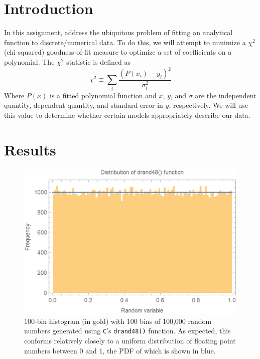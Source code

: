 \documentclass{article}
\author{\hwauthor}
\title{\hwtitle}
\date{\hwdate}
\begin{document}
\maketitle
\thispagestyle{fancy}

\section{Introduction}

In this assignment, address the ubiquitous problem of fitting an analytical function to discrete/numerical data. To do this, we will attempt to minimize a $\chi^2$ (chi-squared) goodness-of-fit measure to optimize a set of coefficients on a polynomial. The $\chi^2$ statistic is defined as \begin{equation*}
    \chi^2 \equiv \sum_i \frac{(P(x_i)-y_i)^2}{\sigma_i^2}
\end{equation*}
Where $P(x)$ is a fitted polynomial function and $x$, $y$, and $\sigma$ are the independent quantity, dependent quantity, and standard error in $y$, respectively. We will use this value to determine whether certain models appropriately describe our data.

\section{Results}

\bigskip
{}
\medskip

\begin{figure}[H]
    \centering
    \includegraphics[width=4.4in]{homework7/uniform_dist.png}
    \caption{100-bin histogram (in gold) with 100 bins of 100,000 random numbers generated using \texttt{C}'s \texttt{drand48()} function. As expected, this conforms relatively closely to a uniform distribution of floating point numbers between 0 and 1, the PDF of which is shown in blue.}
    \label{fig:drand48}
\end{figure}
\end{document}
